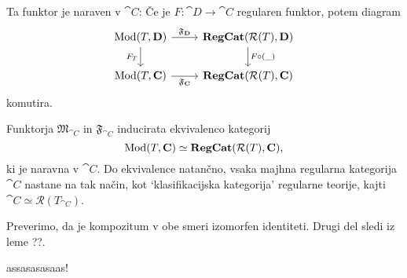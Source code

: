 \documentclass[../kategoricna_logika.tex]{subfiles}
\begin{document}
Ta funktor je naraven v $\cat{C}$: Če je $F : \cat{D} \to \cat{C}$ regularen funktor, potem diagram
\begin{equation}
  \begin{tikzcd}
    \Mod(T, \cat{D}) \ar[d, "F_T"'] \ar[r, "\mathfrak{F}_{\cat{D}}"] & \cat{RegCat}(\mathcal{R}(T), \cat{D}) \ar[d, "F \circ (\_)"] \\
    \Mod(T, \cat{C}) \ar[r, "\mathfrak{F}_{\cat{C}}"'] & \cat{RegCat}(\mathcal{R}(T), \cat{C})
  \end{tikzcd}
\end{equation}
komutira.
\begin{izrek}
  Funktorja $\mathfrak{M}_{\cat{C}}$ in $\mathfrak{F}_{\cat{C}}$ inducirata ekvivalenco kategorij
  $$\operatorname{Mod}(T, {\operatorname{\mathbf{C}}}) \simeq {\operatorname{\mathbf{RegCat}}}(\mathcal{R}(T), {\operatorname{\mathbf{C}}}),$$
  ki je naravna v $\cat{C}$. Do ekvivalence natančno, vsaka majhna regularna kategorija $\cat{C}$ nastane na tak način, kot `klasifikacijska kategorija' regularne teorije, kajti $\cat{C} \simeq \mathcal{R}(T_{\cat{C}})$.
\end{izrek}
\begin{dokaz}
  Preverimo, da je kompozitum v obe smeri izomorfen identiteti. Drugi del sledi iz leme ??.
\end{dokaz}
assasasasaas!
\end{document}
